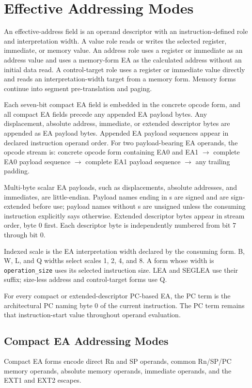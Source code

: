 \clearpage
\section{Effective Addressing Modes}\label{page:effective-addressing-modes}

An effective-address field is an operand descriptor with an instruction-defined role and interpretation width. A
value role reads or writes the selected register, immediate, or memory value. An address role uses a register or
immediate as an address value and uses a memory-form EA as the calculated address without an initial data read. A
control-target role uses a register or immediate value directly and reads an interpretation-width target from a
memory form. Memory forms continue into segment pre-translation and paging.

Each seven-bit compact EA field is embedded in the concrete opcode form, and all compact EA fields precede any
appended EA payload bytes. Any displacement, absolute address, immediate, or extended descriptor bytes are appended as EA
payload bytes. Appended EA payload sequences appear in declared instruction operand order. For two payload-bearing EA
operands, the opcode stream is: concrete opcode form containing EA0 and EA1 $\rightarrow$ complete EA0 payload
sequence $\rightarrow$ complete EA1 payload sequence $\rightarrow$ any trailing padding.

Multi-byte scalar EA payloads, such as displacements, absolute addresses, and immediates, are little-endian. Payload
names ending in s are signed and are sign-extended before use; payload names without s are unsigned unless the
consuming instruction explicitly says otherwise. Extended descriptor bytes appear in stream order, byte 0 first. Each
descriptor byte is independently numbered from bit 7 through bit 0.

Indexed scale is the EA interpretation width declared by the consuming form. B, W, L, and Q widths select scales 1,
2, 4, and 8. A form whose width is \texttt{operation\_size} uses its selected instruction size. LEA and SEGLEA use
their suffix; size-less address and control-target forms use Q.

For every compact or extended-descriptor PC-based EA, the PC term is the architectural PC naming byte 0 of the current instruction.
The PC term remains that instruction-start value throughout operand evaluation.

\clearpage
\subsection{Compact EA Addressing Modes}
Compact EA forms encode direct Rn and SP operands, common Rn/SP/PC memory
operands, absolute memory operands, immediate operands, and the EXT1 and EXT2 escapes.

